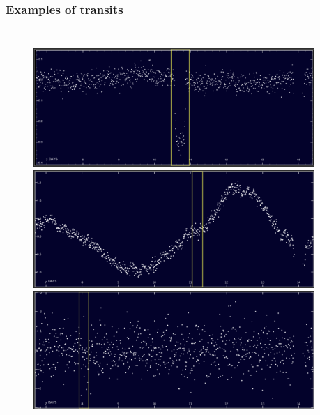 \documentclass{beamer}
\begin{document}
\begin{frame}
\frametitle{Examples of transits}
\begin{columns}[c]

\begin{figure}
\includegraphics[width=0.95\textwidth]{img/zooniverse.org/obvious_transit.png}
\includegraphics[width=0.95\textwidth]{img/zooniverse.org/shallow_transit.png}
\includegraphics[width=0.95\textwidth]{img/zooniverse.org/stellar_variability_transit.png}
\captionsetup{labelformat=empty}
\end{figure}


\end{columns}
\end{frame}
\end{document}
